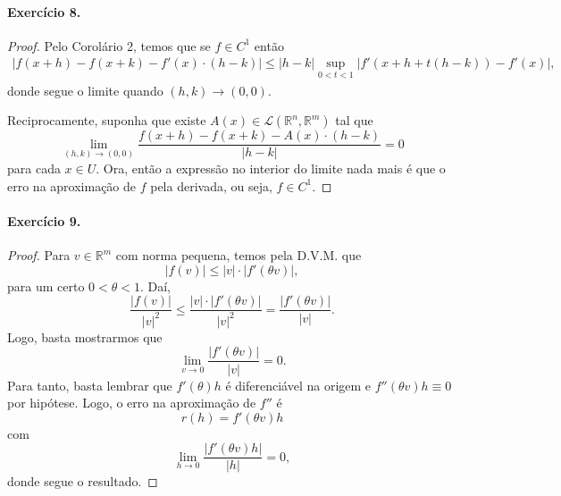 \documentclass[12pt,a4paper]{article}
\newcommand{\R}{\mathbb{R}}
\begin{document}
\paragraph{Exercício 8.}
    \begin{proof}
        Pelo Corolário 2, temos que se $f\in C^1$ então
        \begin{align*}
            |f(x+h) - f(x+k) - f'(x)\cdot (h-k)| \leq |h-k|\sup_{0<t<1} |f'(x+h + t(h-k)) - f'(x)|,
        \end{align*}
        donde segue o limite quando $(h,k)\to (0,0)$.
        
        Reciprocamente, suponha que existe $A(x)\in\mathcal{L}(\R^n, \R^m)$ tal que
        \begin{equation*}
            \lim_{(h,k)\to (0,0)} \frac{f(x+h) - f(x+k) - A(x)\cdot (h-k)}{|h-k|} = 0
        \end{equation*}
        para cada $x\in U$. Ora, então a expressão no interior do limite nada mais é que
        o erro na aproximação de $f$ pela derivada, ou seja, $f\in C^1$.
    \end{proof}
\paragraph{Exercício 9.}
    \begin{proof}
        Para $v\in\R^m$ com norma pequena, temos pela D.V.M. que
        \begin{equation*}
            |f(v)| \leq |v|\cdot|f'(\theta v)|, 
        \end{equation*}
        para um certo $0 < \theta < 1$. Daí,
        \begin{equation*}
            \frac{|f(v)|}{|v|^2} \leq \frac{|v|\cdot |f'(\theta v)|}{|v|^2} = \frac{|f'(\theta v)|}{|v|}.
        \end{equation*}
        Logo, basta mostrarmos que
        \begin{equation*}
            \lim_{v\to 0} \frac{|f'(\theta v)|}{|v|} = 0.
        \end{equation*}
        Para tanto, basta lembrar que $f'(\theta)h$ é diferenciável na origem e $f''(\theta v)h\equiv 0$
        por hipótese. Logo, o erro na aproximação de $f''$ é
        \begin{equation*}
            r(h) = f'(\theta v)h
        \end{equation*}
        com
        \begin{equation*}
            \lim_{h\to 0} \frac{|f'(\theta v)h|}{|h|} = 0,
        \end{equation*}
        donde segue o resultado.
    \end{proof}
\end{document}
